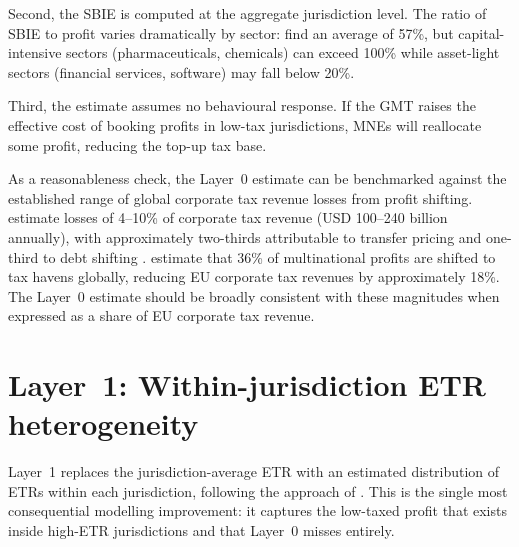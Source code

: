 \documentclass[11pt,a4paper]{article}
\begin{document}
Second, the SBIE is computed at the aggregate jurisdiction level. The ratio of SBIE to profit varies dramatically by sector: \citet{devereux2023} find an average of 57\%, but capital-intensive sectors (pharmaceuticals, chemicals) can exceed 100\% while asset-light sectors (financial services, software) may fall below 20\%.

Third, the estimate assumes no behavioural response. If the GMT raises the effective cost of booking profits in low-tax jurisdictions, MNEs will reallocate some profit, reducing the top-up tax base.

As a reasonableness check, the Layer~0 estimate can be benchmarked against the established range of global corporate tax revenue losses from profit shifting. \citet{johansson2017} estimate losses of 4--10\% of corporate tax revenue (USD 100--240 billion annually), with approximately two-thirds attributable to transfer pricing and one-third to debt shifting \citep{riedel2018,torslov2022}. \citet{torslov2022} estimate that 36\% of multinational profits are shifted to tax havens globally, reducing EU corporate tax revenues by approximately 18\%. The Layer~0 estimate should be broadly consistent with these magnitudes when expressed as a share of EU corporate tax revenue.

\section{Layer~1: Within-jurisdiction ETR heterogeneity}\label{sec:layer1}

Layer~1 replaces the jurisdiction-average ETR with an estimated distribution of ETRs within each jurisdiction, following the approach of \citet{hugger2025}. This is the single most consequential modelling improvement: it captures the low-taxed profit that exists inside high-ETR jurisdictions and that Layer~0 misses entirely.
\end{document}

